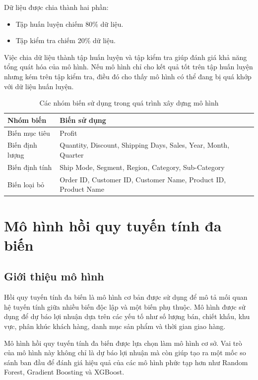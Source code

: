 Dữ liệu được chia thành hai phần:
\begin{itemize}
    \item Tập huấn luyện chiếm 80\% dữ liệu.
    \item Tập kiểm tra chiếm 20\% dữ liệu.
\end{itemize}

Việc chia dữ liệu thành tập huấn luyện và tập kiểm tra giúp đánh giá khả năng tổng quát hóa của mô hình. Nếu mô hình chỉ cho kết quả tốt trên tập huấn luyện nhưng kém trên tập kiểm tra, điều đó cho thấy mô hình có thể đang bị quá khớp với dữ liệu huấn luyện.

\begin{table}[H]
\centering
\caption{Các nhóm biến sử dụng trong quá trình xây dựng mô hình}
\label{tab:model_variables}
\begin{tabular}{|p{4cm}|p{8cm}|}
\hline
\textbf{Nhóm biến} & \textbf{Biến sử dụng} \\ \hline
Biến mục tiêu & Profit \\ \hline
Biến định lượng & Quantity, Discount, Shipping Days, Sales, Year, Month, Quarter \\ \hline
Biến định tính & Ship Mode, Segment, Region, Category, Sub-Category \\ \hline
Biến loại bỏ & Order ID, Customer ID, Customer Name, Product ID, Product Name \\ \hline
\end{tabular}
\end{table}

\section{Mô hình hồi quy tuyến tính đa biến}


\subsection*{\thesubsection\quad Giới thiệu mô hình}


Hồi quy tuyến tính đa biến là mô hình cơ bản được sử dụng để mô tả mối quan hệ tuyến tính giữa nhiều biến độc lập và một biến phụ thuộc. Mô hình được sử dụng để dự báo lợi nhuận dựa trên các yếu tố như số lượng bán, chiết khấu, khu vực, phân khúc khách hàng, danh mục sản phẩm và thời gian giao hàng.

Mô hình hồi quy tuyến tính đa biến được lựa chọn làm mô hình cơ sở. Vai trò của mô hình này không chỉ là dự báo lợi nhuận mà còn giúp tạo ra một mốc so sánh ban đầu để đánh giá hiệu quả của các mô hình phức tạp hơn như Random Forest, Gradient Boosting và XGBoost.

